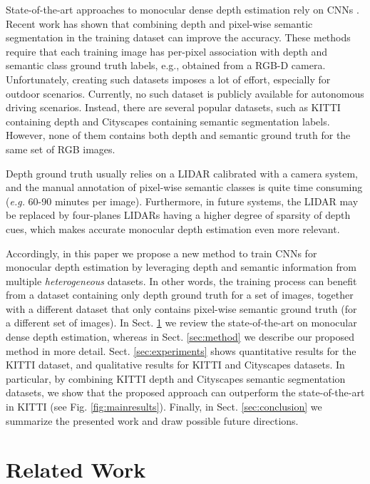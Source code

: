 \documentclass[letterpaper, 10 pt, conference]{ieeeconf}
\newcommand{\eg}{{\em e.g.}}
\newcommand{\Fig}[1]{Fig. \ref{fig:#1}}
\newcommand{\Sect}[1]{Sect. \ref{sec:#1}}
\begin{document}
State-of-the-art approaches to monocular dense depth estimation rely on CNNs \cite{Cao:2017, Fu:2017, Godard:2017, Kuznietsov:2017}. Recent work has shown \cite{Mousavian:2016, Jafari:2017} that combining depth and pixel-wise semantic segmentation in the training dataset can improve the accuracy. These methods require that each training image has per-pixel association with depth and semantic class ground truth labels, e.g., obtained from a RGB-D camera. Unfortunately, creating such datasets imposes a lot of effort, especially for outdoor scenarios. Currently, no such dataset is publicly available for autonomous driving scenarios. Instead, there are several popular datasets, such as KITTI containing depth \cite{Geiger:2013} and Cityscapes \cite{Cordts:2016} containing semantic segmentation labels. However, none of them contains both depth and semantic ground truth for the same set of RGB images. 




Depth ground truth usually relies on a  LIDAR calibrated with a camera system, and the manual annotation of pixel-wise semantic classes is quite time consuming ({\eg} 60-90 minutes per image). Furthermore, in future systems, the  LIDAR may be replaced by four-planes LIDARs having a higher degree of sparsity of depth cues, which makes accurate monocular depth estimation even more relevant.

Accordingly, in this paper we propose a new method to train CNNs for monocular depth estimation by leveraging depth and semantic information from multiple \emph{heterogeneous} datasets. In other words, the training process can benefit from a dataset containing only depth ground truth for a set of images, together with a different dataset that only contains pixel-wise semantic ground truth (for a different set of images). In \Sect{relatedwork} we review the state-of-the-art on monocular dense depth estimation, whereas in \Sect{method} we describe our proposed method in more detail. \Sect{experiments} shows quantitative results for the KITTI dataset, and qualitative results for KITTI and Cityscapes datasets. In particular, by combining KITTI depth and Cityscapes semantic segmentation datasets, we show that the proposed approach can outperform the state-of-the-art in KITTI (see \Fig{mainresults}). Finally, in \Sect{conclusion} we summarize the presented work and draw possible future directions.
 
\section{Related Work}
\label{sec:relatedwork}
\end{document}
